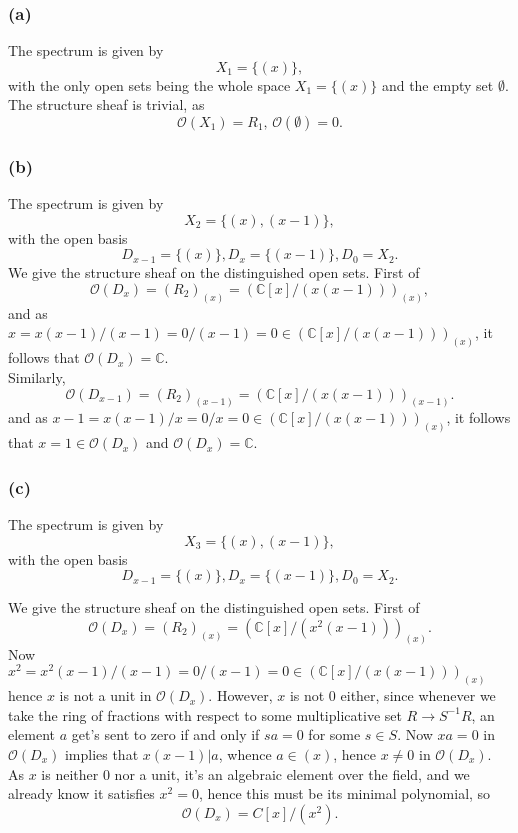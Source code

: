 \documentclass{article}
\theoremstyle{definition}
\newcommand{\C}{\mathbb{C}}
\begin{document}
\subsubsection*{(a)}

The spectrum is given by 
\[
	X_1 
	= 
	\{
		(x)
	\},
\] 
with the only open sets being the whole space $X_1 = \{(x)\}$ and the empty set
$\emptyset$. The structure sheaf is trivial, as
\[
	\mathcal{O}(X_1) = R_1,\,  
	\mathcal{O}(\emptyset) = 0. 
\] 

\subsubsection*{(b)}

The spectrum is given by 
\[
	X_2 
	= 
	\{
		(x),
		(x - 1)
	\},
\] 
with the open basis 
\[
	D_{x - 1} = \{(x)\},
	D_{x} = \{(x - 1)\},
	D_{0} = X_2.
\] 
We give the structure sheaf on the distinguished open sets. First of 
\[
	\mathcal{O}(D_{x}) 
	= 
	(R_2)_{(x)}  
	=
	(\C[x]/(x(x-1)))_{(x)},
\] 
and as $x = x(x - 1)/(x - 1) = 0/(x - 1) = 0 \in (\C[x]/(x(x-1)))_{(x)}$, it follows that 
$\mathcal{O}(D_{x}) = \C$. \\

Similarly, 
\[
	\mathcal{O}(D_{x - 1}) 
	= 
	(R_2)_{(x - 1)}  
	=
	(\C[x]/(x(x-1)))_{(x - 1)}.
\] 
and as $x - 1 = x(x - 1)/x = 0/x = 0 \in (\C[x]/(x(x-1)))_{(x)}$, it follows that 
$x = 1 \in \mathcal{O}(D_{x})$ and $\mathcal{O}(D_{x}) = \C$. 

\subsubsection*{(c)}

The spectrum is given by 
\[
	X_3 
	= 
	\{
		(x),
		(x - 1)
	\},
\] 
with the open basis 
\[
	D_{x - 1} = \{(x)\},
	D_{x} = \{(x - 1)\},
	D_{0} = X_2.
\] 

We give the structure sheaf on the distinguished open sets. First of 
\[
	\mathcal{O}(D_{x}) 
	= 
	(R_2)_{(x)}  
	=
	(\C[x]/(x^2(x-1)))_{(x)}.
\] 
Now $x^2 = x^2(x - 1)/(x - 1) = 0/(x - 1) = 0 \in (\C[x]/(x(x-1)))_{(x)}$ hence
$x$ is not a unit in $\mathcal{O}(D_{x})$. However, $x$ is not $0$ either,
since whenever we take the ring of fractions with respect to some
multiplicative set $R \to S^{-1}R$, an element $a$ get's sent to zero if and
only if $sa = 0$ for some $s \in S$. Now $xa = 0$ in $\mathcal{O}(D_{x})$
implies that $x(x-1) | a$, whence $a \in (x)$, hence $x \not = 0$ in
$\mathcal{O}(D_{x})$. As $x$ is neither $0$ nor a unit, it's an algebraic
element over the field, and we already know it satisfies $x^2 = 0$, hence this
must be its minimal polynomial, so
\[
	\mathcal{O}(D_{x}) = C[x]/(x^2).
\]
\end{document}
